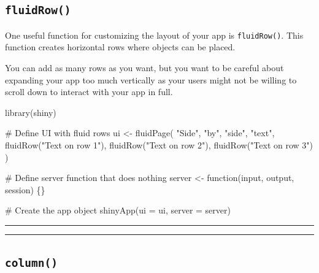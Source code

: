 \documentclass[
  letterpaper,
  DIV=11,
  numbers=noendperiod]{scrreprt}
\newenvironment{Shaded}{\begin{snugshade}}{\end{snugshade}}
\newcommand{\AttributeTok}[1]{\textcolor[rgb]{0.40,0.46,0.14}{#1}}
\newcommand{\CommentTok}[1]{\textcolor[rgb]{0.37,0.37,0.37}{#1}}
\newcommand{\ControlFlowTok}[1]{\textcolor[rgb]{0.00,0.46,0.62}{#1}}
\newcommand{\FunctionTok}[1]{\textcolor[rgb]{0.28,0.35,0.67}{#1}}
\newcommand{\NormalTok}[1]{\textcolor[rgb]{0.00,0.46,0.62}{#1}}
\newcommand{\OtherTok}[1]{\textcolor[rgb]{0.00,0.46,0.62}{#1}}
\newcommand{\StringTok}[1]{\textcolor[rgb]{0.13,0.47,0.30}{#1}}
\begin{document}
\hypertarget{fluidrow}{%
\subsection{\texorpdfstring{\texttt{fluidRow()}}{fluidRow()}}\label{fluidrow}}

One useful function for customizing the layout of your app is
\texttt{fluidRow()}. This function creates horizontal rows where objects
can be placed.

You can add as many rows as you want, but you want to be careful about
expanding your app too much vertically as your users might not be
willing to scroll down to interact with your app in full.

\begin{Shaded}
\begin{Highlighting}[]
\FunctionTok{library}\NormalTok{(shiny)}

\CommentTok{\# Define UI with fluid rows}
\NormalTok{ui }\OtherTok{\textless{}{-}} \FunctionTok{fluidPage}\NormalTok{(}
  \StringTok{"Side"}\NormalTok{, }\StringTok{"by"}\NormalTok{, }\StringTok{"side"}\NormalTok{, }\StringTok{"text"}\NormalTok{,}
  \FunctionTok{fluidRow}\NormalTok{(}\StringTok{"Text on row 1"}\NormalTok{),}
  \FunctionTok{fluidRow}\NormalTok{(}\StringTok{"Text on row 2"}\NormalTok{),}
  \FunctionTok{fluidRow}\NormalTok{(}\StringTok{"Text on row 3"}\NormalTok{)}
\NormalTok{)}

\CommentTok{\# Define server function that does nothing}
\NormalTok{server }\OtherTok{\textless{}{-}} \ControlFlowTok{function}\NormalTok{(input, output, session) \{\}}

\CommentTok{\# Create the app object}
\FunctionTok{shinyApp}\NormalTok{(}\AttributeTok{ui =}\NormalTok{ ui, }\AttributeTok{server =}\NormalTok{ server)}
\end{Highlighting}
\end{Shaded}

\begin{center}\rule{0.5\linewidth}{0.5pt}\end{center}

\begin{center}\rule{0.5\linewidth}{0.5pt}\end{center}

\hypertarget{column}{%
\subsection{\texorpdfstring{\texttt{column()}}{column()}}\label{column}}
\end{document}
